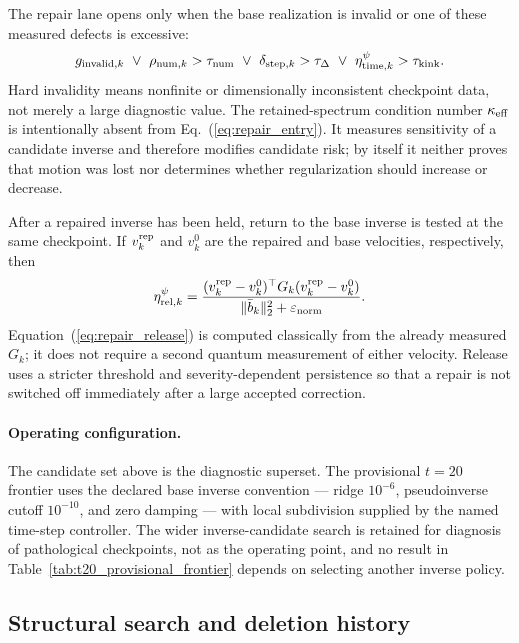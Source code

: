 \documentclass[
  reprint,
  amsmath,
  amssymb,
  aps,
  pra,
  nofootinbib,
  superscriptaddress,
  floatfix
]{revtex4-2}
\newcommand{\eps}{\varepsilon}
\begin{document}
The repair lane opens only when the base realization is invalid or one of these measured defects is excessive:
\begin{equation}
g_{{\rm invalid},k}
\ \vee\
\rho_{{\rm num},k}>\tau_{\rm num}
\ \vee\
\delta_{{\rm step},k}>\tau_\Delta
\ \vee\
\eta_{{\rm time},k}^{\psi}>\tau_{\rm kink}.
\label{eq:repair_entry}
\end{equation}
Hard invalidity means nonfinite or dimensionally inconsistent checkpoint data, not merely a large diagnostic value.  The retained-spectrum condition number \(\kappa_{\rm eff}\) is intentionally absent from Eq.~(\ref{eq:repair_entry}).  It measures sensitivity of a candidate inverse and therefore modifies candidate risk; by itself it neither proves that motion was lost nor determines whether regularization should increase or decrease.

After a repaired inverse has been held, return to the base inverse is tested at the same checkpoint.  If \(v_k^{\rm rep}\) and \(v_k^{0}\) are the repaired and base velocities, respectively, then
\begin{equation}
\eta_{{\rm rel},k}^{\psi}
=
\frac{
(v_k^{\rm rep}-v_k^{0})^\top
G_k
(v_k^{\rm rep}-v_k^{0})
}{
\|\bar b_k\|_2^2+\eps_{\rm norm}
}.
\label{eq:repair_release}
\end{equation}
Equation~(\ref{eq:repair_release}) is computed classically from the already measured \(G_k\); it does not require a second quantum measurement of either velocity.  Release uses a stricter threshold and severity-dependent persistence so that a repair is not switched off immediately after a large accepted correction.

\paragraph*{Operating configuration.}  The candidate set above is the
diagnostic superset.  The provisional $t=20$ frontier uses the declared base
inverse convention --- ridge $10^{-6}$, pseudoinverse cutoff $10^{-10}$, and
zero damping --- with local subdivision supplied by the named time-step
controller.  The wider inverse-candidate search is retained for diagnosis of
pathological checkpoints, not as the operating point, and no result in
Table~\ref{tab:t20_provisional_frontier} depends on selecting another inverse
policy.

\subsection{Structural search and deletion history}
\end{document}
